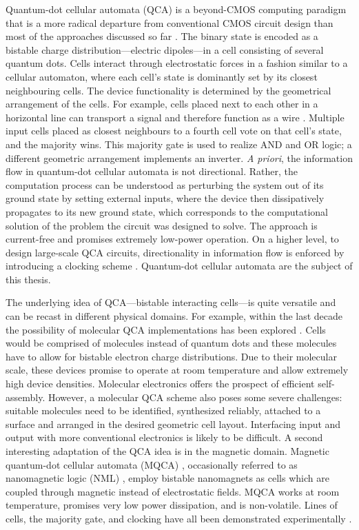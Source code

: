 Quantum-dot cellular automata (QCA) is a beyond-CMOS computing paradigm that is
a more radical departure from conventional CMOS circuit design than most of the
approaches discussed so far \cite{lent1993quantum}. The binary state is encoded
as a bistable charge distribution---electric dipoles---in a cell consisting of
several quantum dots. Cells interact through electrostatic forces in a fashion
similar to a cellular automaton, where each cell's state is dominantly set by
its closest neighbouring cells. The device functionality is determined by the
geometrical arrangement of the cells. For example, cells placed next to each other in
a horizontal line can transport a signal and therefore function as a wire
\cite{lent1993lines}. Multiple input cells placed as closest neighbours to a
fourth cell vote on that cell's state, and the majority wins. This majority gate
is used to realize AND and OR logic; a different geometric arrangement
implements an inverter. \emph{A priori}, the information flow in quantum-dot
cellular automata is not directional. Rather, the computation process can be
understood as perturbing the system out of its ground state by setting external
inputs, where the device then dissipatively propagates to its new ground state,
which corresponds to the computational solution of the problem the circuit was
designed to solve. The approach is current-free and promises extremely low-power
operation. On a higher level, to design large-scale QCA circuits, directionality
in information flow is enforced by introducing a clocking scheme
\cite{lent1997device}. Quantum-dot cellular automata are the subject of this
thesis.

The underlying idea of QCA---bistable interacting cells---is quite versatile and
can be recast in different physical domains. For example, within the last decade
the possibility of molecular QCA implementations has been explored
\cite{lent2000bypassing} \cite{lent2003molecular}. Cells would be comprised of
molecules instead of quantum dots and these molecules have to allow for bistable
electron charge distributions. Due to their molecular scale, these devices
promise to operate at room temperature and allow extremely high device
densities.  Molecular electronics offers the prospect of efficient
self-assembly. However, a molecular QCA scheme also poses some severe
challenges: suitable molecules need to be identified, synthesized reliably,
attached to a surface and arranged in the desired geometric cell layout.
Interfacing input and output with more conventional electronics is likely to be
difficult. A second interesting adaptation of the QCA idea is in the magnetic
domain. Magnetic quantum-dot cellular automata (MQCA) \cite{cowburn2000room}
\cite{bernstein2005magnetic}, occasionally referred to as nanomagnetic logic
(NML) \cite{cavin2012science}, employ bistable nanomagnets as cells which are
coupled through magnetic instead of electrostatic fields. MQCA works at room
temperature, promises very low power dissipation, and is non-volatile. Lines of
cells, the majority gate, and clocking have all been demonstrated experimentally
\cite{imre2006majority} \cite{alam2007clocking} \cite{alam2012chip}.

